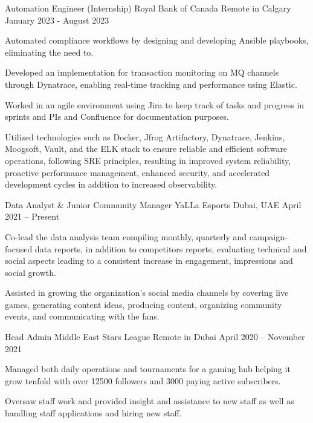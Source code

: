 \documentclass[]{awesome-cv}
\begin{document}
\vspace{-2mm}
\begin{cventries}
	\cventry
	{Automation Engineer (Internship)}
	{Royal Bank of Canada}
	{Remote in Calgary}
	{January 2023 - August 2023}
	{\begin{cvitems}
		\item {Automated compliance workflows by designing and developing Ansible playbooks, eliminating the need to.}
		\item {Developed an implementation for transaction monitoring on MQ channels through Dynatrace, enabling real-time tracking and performance using Elastic.}
		\item {Worked in an agile environment using Jira to keep track of tasks and progress in sprints and PIs and Confluence for documentation purposes.}
  		\item {Utilized technologies such as Docker, Jfrog Artifactory, Dynatrace, Jenkins, Moogsoft, Vault, and the ELK stack to ensure reliable and efficient software operations, following SRE principles, resulting in improved system reliability, proactive performance management, enhanced security, and accelerated development cycles in addition to increased observability.}
		\end{cvitems}}
		\vspace{1mm}
  
	\cventry
	{Data Analyst \& Junior Community Manager}
	{YaLLa Esports}
	{Dubai, UAE}
	{April 2021 – Present}
	{\begin{cvitems}
		\item {Co-lead the data analysis team compiling monthly, quarterly and campaign-focused data reports, in addition to competitors reports, evaluating technical and social aspects leading to a consistent increase in engagement, impressions and social growth.}
		\item {Assisted in growing the organization's social media channels by covering live games, generating content ideas, producing content, organizing community events, and communicating with the fans.}
		\end{cvitems}}
		\vspace{1mm}
	\cventry
	{Head Admin}
	{Middle East Stars League}
	{Remote in Dubai}
	{April 2020 – November 2021}
	{\begin{cvitems}
		\item {Managed both daily operations and tournaments for a gaming hub helping it grow tenfold with over 12500 followers and 3000 paying active subscribers.}
		\item {Oversaw staff work and provided insight and assistance to new staff as well as handling staff applications and hiring new staff.}
		\end{cvitems}}


\end{cventries}
\end{document}
